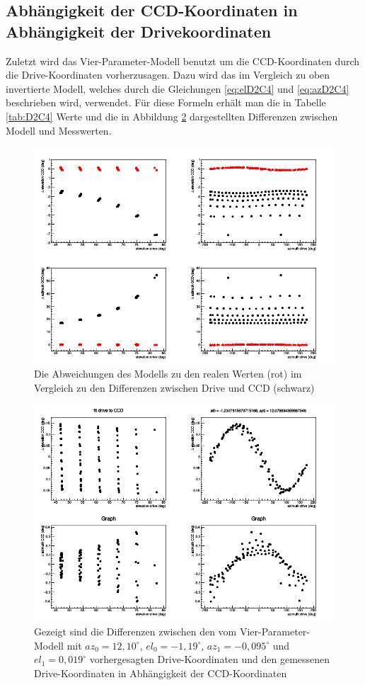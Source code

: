 \subsection{Abhängigkeit der CCD-Koordinaten in Abhängigkeit der Drivekoordinaten}
Zuletzt wird das Vier-Parameter-Modell benutzt um die CCD-Koordinaten durch die Drive-Koordinaten vorherzusagen. Dazu wird das im Vergleich zu oben invertierte Modell, welches durch die Gleichungen \ref{eq:elD2C4} und \ref{eq:azD2C4} beschrieben wird, verwendet. Für diese Formeln erhält man die in Tabelle \ref{tab:D2C4} Werte und die in Abbildung \ref{img:D2C4} dargestellten Differenzen zwischen Modell und Messwerten.
\begin{figure}[htbp]
\centering
\includegraphics[width=\textwidth]{../341/D2C4comp.png}
\caption{Die Abweichungen des Modells zu den realen Werten (rot) im Vergleich zu den Differenzen zwischen Drive und CCD (schwarz)}
\label{img:D2C4comp}
\end{figure}
\begin{figure}[htbp]
\centering
\includegraphics[width=\textwidth]{../341/run341D2C4.png}
\caption{Gezeigt sind die Differenzen zwischen den vom Vier-Parameter-Modell mit $az_0=12,10^{\circ}$, $el_0=-1,19^{\circ}$, $az_1=-0,095^{\circ}$ und $el_1=0,019^{\circ}$ vorhergesagten Drive-Koordinaten und den gemessenen Drive-Koordinaten in Abhängigkeit der CCD-Koordinaten}
\label{img:D2C4}
\end{figure}
